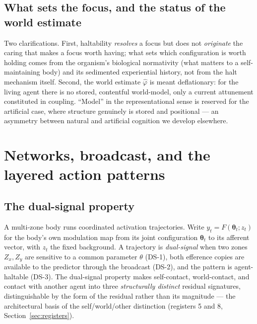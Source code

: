 \documentclass[utf8]{FrontiersinHarvard}
\begin{document}
\subsection{What sets the focus, and the status of the world estimate}
Two clarifications. First, haltability \emph{resolves} a focus but does not \emph{originate} the caring that makes a focus worth having; what sets which configuration is worth holding comes from the organism's biological normativity (what matters to a self-maintaining body) and its sedimented experiential history, not from the halt mechanism itself. Second, the world estimate $\hat\varphi$ is meant deflationary: for the living agent there is no stored, contentful world-model, only a current attunement constituted in coupling. ``Model'' in the representational sense is reserved for the artificial case, where structure genuinely is stored and positional --- an asymmetry between natural and artificial cognition we develop elsewhere.

\section{Networks, broadcast, and the layered action patterns}\label{sec:network}

\subsection{The dual-signal property}
A multi-zone body runs coordinated activation trajectories. Write $y_t = F(\boldsymbol\theta_t; z_t)$ for the body's own modulation map from its joint configuration $\boldsymbol\theta_t$ to its afferent vector, with $z_t$ the fixed background. A trajectory is \emph{dual-signal} when two zones $Z_x,Z_y$ are sensitive to a common parameter $\theta$ (DS-1), both efference copies are available to the predictor through the broadcast (DS-2), and the pattern is agent-haltable (DS-3). The dual-signal property makes self-contact, world-contact, and contact with another agent into three \emph{structurally distinct} residual signatures, distinguishable by the form of the residual rather than its magnitude --- the architectural basis of the self/world/other distinction (registers 5 and 8, Section~\ref{sec:registers}).
\end{document}
